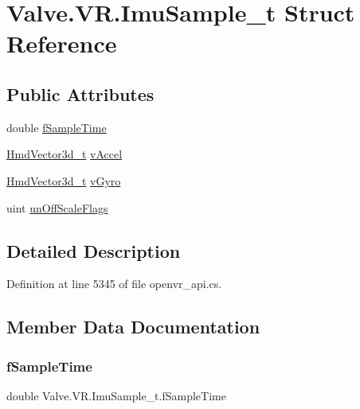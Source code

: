 \hypertarget{struct_valve_1_1_v_r_1_1_imu_sample__t}{}\section{Valve.\+V\+R.\+Imu\+Sample\+\_\+t Struct Reference}
\label{struct_valve_1_1_v_r_1_1_imu_sample__t}
\subsection*{Public Attributes}
\begin{DoxyCompactItemize}
\item 
double \mbox{\hyperlink{struct_valve_1_1_v_r_1_1_imu_sample__t_a07d9d407fe2715b634a2face9ef1eda4}{f\+Sample\+Time}}
\item 
\mbox{\hyperlink{struct_valve_1_1_v_r_1_1_hmd_vector3d__t}{Hmd\+Vector3d\+\_\+t}} \mbox{\hyperlink{struct_valve_1_1_v_r_1_1_imu_sample__t_a0f03d744ea1e9cc7a33a1cc45cbaf36e}{v\+Accel}}
\item 
\mbox{\hyperlink{struct_valve_1_1_v_r_1_1_hmd_vector3d__t}{Hmd\+Vector3d\+\_\+t}} \mbox{\hyperlink{struct_valve_1_1_v_r_1_1_imu_sample__t_adef84df4b5b11ab7fae3af8e396e1a69}{v\+Gyro}}
\item 
uint \mbox{\hyperlink{struct_valve_1_1_v_r_1_1_imu_sample__t_af6856ff4286e941c91c3c1a61343f905}{un\+Off\+Scale\+Flags}}
\end{DoxyCompactItemize}


\subsection{Detailed Description}


Definition at line 5345 of file openvr\+\_\+api.\+cs.



\subsection{Member Data Documentation}
\mbox{\label{struct_valve_1_1_v_r_1_1_imu_sample__t_a07d9d407fe2715b634a2face9ef1eda4}} 
\subsubsection{\texorpdfstring{fSampleTime}{fSampleTime}}
{\footnotesize\ttfamily double Valve.\+V\+R.\+Imu\+Sample\+\_\+t.\+f\+Sample\+Time}



